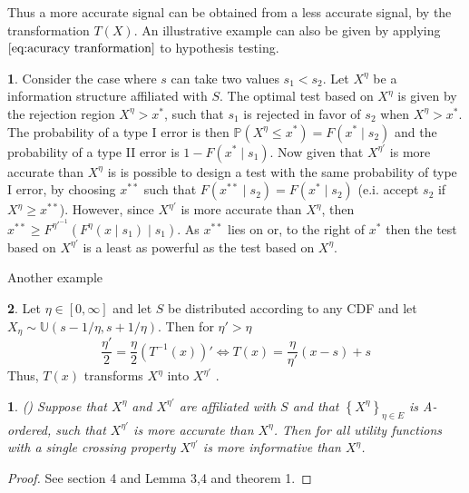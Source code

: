 \documentclass[10pt,english,paper=a4,fontsize=10pt]{scrartcl}
\theoremstyle{definition}
\theoremstyle{plain}
\newtheorem{thm}{\protect\theoremname}
\theoremstyle{definition}
\newtheorem{example}{\protect\examplename}
\providecommand{\examplename}{Example}
\providecommand{\theoremname}{Theorem}
\begin{document}
Thus a more accurate signal can be obtained from a less accurate signal,
by the transformation $T(X)$. An illustrative example can also be
given by applying $\eqref{eq:acuracy tranformation}$ to hypothesis
testing. 
\begin{example}
Consider the case where $s$ can take two values $s_{1}<s_{2}$. Let
$X^{\eta}$ be a information structure affiliated with $S$. The optimal
test based on $X^{\eta}$ is given by the rejection region $X^{\eta}>x^{*}$,
such that $s_{1}$ is rejected in favor of $s_{2}$ when $X^{\eta}>x^{*}$.
The probability of a type I error is then $\mathbb{P}(X^{\eta}\le x^{*})=F(x^{*}\mid s_{2})$
and the probability of a type II error is $1-F(x^{*}\mid s_{1})$.
Now given that $X^{\eta'}$ is more accurate than $X^{\eta}$ is is
possible to design a test with the same probability of type I error,
by choosing $x^{**}$ such that $F(x^{**}\mid s_{2})=F(x^{*}\mid s_{2})$
(e.i. accept $s_{2}$ if $X^{\eta}\ge x^{**}$). However, since $X^{\eta'}$
is more accurate than $X^{\eta}$, then $x^{**}\ge F^{\eta'^{-1}}(F^{\eta}(x\mid s_{1})\mid s_{1})$.
As $x^{**}$ lies on or, to the right of $x^{*}$ then the test based
on $X^{\eta'}$ is a least as powerful as the test based on $X^{\eta}$\cite{Lehmann1988,Acquisition2000}.
\end{example}
Another example
\begin{example}
Let $\eta\in[0,\infty]$ and let $S$ be distributed according to
any CDF and let $X_{\eta}\sim\mathbb{U}(s-1/\eta,s+1/\eta)$. Then
for $\eta'>\eta$ 
\[
\frac{\eta'}{2}=\frac{\eta}{2}\left(T^{-1}(x)\right)'\Leftrightarrow T(x)=\frac{\eta}{\eta'}(x-s)+s
\]
 Thus, $T(x)$ transforms $X^{\eta}$ into $X^{\eta'}$ \cite{Persico1996}.\end{example}
\begin{thm}
(\cite{Acquisition2000}) Suppose that $X^{\eta}$ and $X^{\eta'}$
are affiliated with $S$ and that $\left\{ X^{\eta}\right\} _{\eta\in E}$
is A-ordered, such that $X^{\eta'}$ is more accurate than $X^{\eta}$.
Then for all utility functions with a single crossing property $X^{\eta'}$
is more informative than $X^{\eta}$.\end{thm}
\begin{proof}
See \cite{Lehmann1988} section 4 and \cite{Karlin1956a} Lemma 3,4
and theorem 1.
\end{proof}


\end{document}

